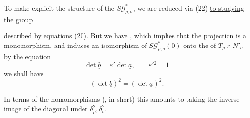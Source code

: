 To make explicit the structure of the $S\mathcal{G}_{\rho,\sigma}^{*}$,
we are reduced via (22) \uline{to studying the}
group


described by equations (20). But we have
,
which implies that the projection
is a monomorphism, and induces an isomorphism of
$S\mathcal{G}_{\rho,\sigma}^{*}(0)$ onto the  of $T_\rho\times N'_\sigma$
 by the equation
\[
\det\underline{b}=\varepsilon'\det\underline{a},\qquad \varepsilon'{}^2=1
\tag{21}
\]
we shall have
\[
(\det\underline{b})^2=(\det\underline{a})^2.
\]

In terms of the homomorphisms (, in short)
this amounts to taking the inverse image of the
diagonal  under $\delta_\rho^2,\delta_\sigma^2$.

